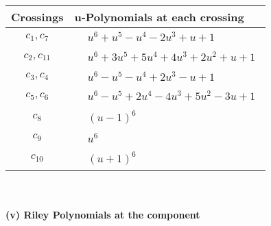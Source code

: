 \documentclass[1p]{elsarticle_modified}
\theoremstyle{definition}
\begin{document}
\begin{tabular}{m{50pt}|m{274pt}}
Crossings & \hspace{64pt}u-Polynomials at each crossing \\
\hline $$\begin{aligned}c_{1},c_{7}\end{aligned}$$&$\begin{aligned}
&u^6+u^5- u^4-2 u^3+u+1
\end{aligned}$\\
\hline $$\begin{aligned}c_{2},c_{11}\end{aligned}$$&$\begin{aligned}
&u^6+3 u^5+5 u^4+4 u^3+2 u^2+u+1
\end{aligned}$\\
\hline $$\begin{aligned}c_{3},c_{4}\end{aligned}$$&$\begin{aligned}
&u^6- u^5- u^4+2 u^3- u+1
\end{aligned}$\\
\hline $$\begin{aligned}c_{5},c_{6}\end{aligned}$$&$\begin{aligned}
&u^6- u^5+2 u^4-4 u^3+5 u^2-3 u+1
\end{aligned}$\\
\hline $$\begin{aligned}c_{8}\end{aligned}$$&$\begin{aligned}
&(u-1)^6
\end{aligned}$\\
\hline $$\begin{aligned}c_{9}\end{aligned}$$&$\begin{aligned}
&u^6
\end{aligned}$\\
\hline $$\begin{aligned}c_{10}\end{aligned}$$&$\begin{aligned}
&(u+1)^6
\end{aligned}$\\
\hline
\end{tabular}\\~\\
\newpage\renewcommand{\arraystretch}{1}
\flushleft \textbf{(v) Riley Polynomials at the component}\newline \\
\end{document}
